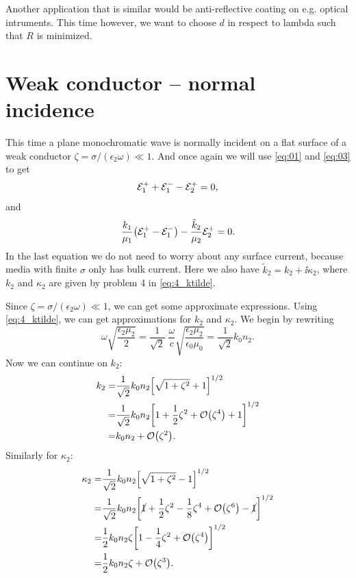 \documentclass[11pt,letter, swedish, english
]{article}
\begin{document}
Another application that is similar would be anti-reflective coating
on e.g. optical intruments. This time however, we want to
choose $d$ in respect to lambda such that $R$ is minimized. 







\section{Weak conductor -- normal incidence}
\newcommand{\kt}{\tilde{k}}

This time a plane monochromatic wave is normally incident on a flat
surface of a weak conductor $\zeta=\sigma/(\epsilon_2\omega)\ll1$. And
once again we will use \eqref{eq:01} and \eqref{eq:03} to get
\begin{equation}\label{eq:2_BC1}
{\mathcal{E}_1^+}+{\mathcal{E}_1^-} -{\mathcal{E}_2^+} =0, 
\end{equation}
and 
\begin{equation}\label{eq:2_BC2}
\frac{k_1}{\mu_1}\qty(\Ep-\Em) 
-\frac{\kt_2}{\mu_2}\Epp =0.
\end{equation}
In the last equation we do not need to worry about any surface
current, because media with finite $\sigma$ only has bulk
current. Here we also have $\kt_{2} = k_2 + \ii\kappa_2$, where
$k_2$ and $\kappa_2$ are given by problem 4 in \eqref{eq:4_ktilde}.

Since $\zeta=\sigma/(\epsilon_2\omega)\ll1$, we can get some
approximate expressions. Using \eqref{eq:4_ktilde}, we can get
approximations for $k_2$ and $\kappa_2$. We begin by rewriting
\begin{equation}
\omega\sqrt{\frac{\epsilon_2\mu_2}{2}} 
=\frac{1}{\sqrt{2}}\; \frac{\omega}{c} 
\sqrt{\frac{\epsilon_2\mu_2}{\epsilon_0\mu_0}}
=\frac{1}{\sqrt{2}}k_0n_2.
\end{equation}
Now we can continue on $k_2$:
\begin{equation}
\begin{aligned}
k_2 =& \frac{1}{\sqrt{2}}k_0n_2
\qty[\sqrt{1+\zeta^2}+1]^{1/2}\\
=& \frac{1}{\sqrt{2}}k_0n_2
\qty[1+\frac{1}{2}\zeta^2+\order{\zeta^4}+1]^{1/2}\\
=& k_0n_2  +\order{\zeta^2}.
\end{aligned}
\end{equation}
Similarly for $\kappa_2$:
\begin{equation}
\begin{aligned}
\kappa_2 =& \frac{1}{\sqrt{2}}k_0n_2
\qty[\sqrt{1+\zeta^2}-1]^{1/2}\\
=& \frac{1}{\sqrt{2}}k_0n_2
\qty[\cancel{1}+\frac{1}{2}\zeta^2-\frac{1}{8}\zeta^4+
\order{\zeta^6}-\cancel{1}]^{1/2}\\
=& \frac{1}{2}k_0n_2\zeta
\qty[1-\frac{1}{4}\zeta^2+\order{\zeta^4}]^{1/2}\\
=& \frac{1}{2}k_0n_2\zeta +\order{\zeta^3}.
\end{aligned}
\end{equation}
\end{document}
